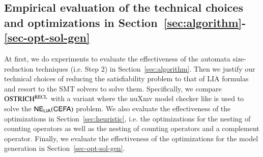 


\subsection{Empirical evaluation of the technical choices and optimizations in Section~\ref{sec:algorithm}-\ref{sec-opt-sol-gen}}\label{subsec:size_reduction_eval}

At first, we do experiments to evaluate the effectiveness of the automata size-reduction techniques (i.e. Step 2) in Section~\ref{sec:algorithm}. Then we justify our technical choices of reducing the satisfiability problem to that of LIA formulas and resort to the SMT solvers to solve them. Specifically, we compare $\rm OSTRICH^{RECL}$ with a variant where the nuXmv model checker like \cite{atva2020} is used to solve the ${\sf NE_{LIA}(CEFA)}$ problem. 
%
We also evaluate the effectiveness of the optimizations in Section~\ref{sec:heuristic}, i.e. the optimizations for the nesting of counting operators as well as the nesting of counting operators and a complement operator. Finally, we evaluate the effectiveness of the optimizations for the model generation in Section~\ref{sec-opt-sol-gen}. 


